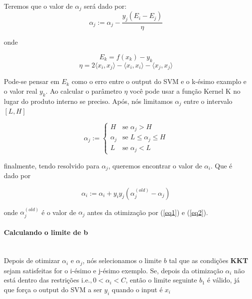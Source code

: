 \documentclass{article}
\begin{document}
Teremos que o valor de \(\alpha_j\) será dado por:
\begin{equation}\label{eq1}
    \alpha_j:=\alpha_j-\frac{y_j(E_i-E_j)}{\eta}
\end{equation}

onde

\begin{equation}\label{eq4}
E_k = f(x_k)-y_k 
\end{equation}
\begin{equation}\label{eq3}
    \eta = 2\langle x_i,x_j\rangle-\langle x_i,x_i\rangle-\langle x_j,x_j\rangle
\end{equation}

Pode-se pensar em \(E_k\) como o erro entre o output do SVM e o k-ésimo examplo e o valor real \(y_k\). Ao calcular o parâmetro \(\eta\) você pode usar a função Kernel K no lugar do produto interno se preciso. Após, nós limitamos \(\alpha_j\) entre o intervalo \([L,H]\)

\begin{equation}\label{eq2}
    \alpha_j :=\begin{cases}
    H &\text{se } \alpha_j>H\\
    \alpha_j &\text{se } L\leq\alpha_j\leq H\\
    L &\text{se } \alpha_j<L
\end{cases}\end{equation}



finalmente, tendo resolvido para \(\alpha_j\), queremos encontrar o valor de \(\alpha_i\). Que é dado por

\[\alpha_i:=\alpha_i+y_i y_j(\alpha_{j}^{(old)}-\alpha_j)\]

onde \(\alpha_{j}^{(old)}\) é o valor de \(\alpha_j\) antes da otimização por (\ref{eq1}) e (\ref{eq2}).

\paragraph{Calculando o limite de b} \hspace{0pt}\\

Depois de otimizar \(\alpha_i\) e \(\alpha_j\), nós selecionamos o limite \(b\) tal que as condições \textbf{KKT} sejam satisfeitas for o i-ésimo e j-ésimo exemplo. Se, depois da otimização \(\alpha_i\) não está dentro das restrições \(\text{i.e.}, 0<\alpha_i<C\), então o limite seguinte \(b_1\) é válido, já que força o output do SVM a ser \(y_i\) quando o input é \(x_i\)
\end{document}
